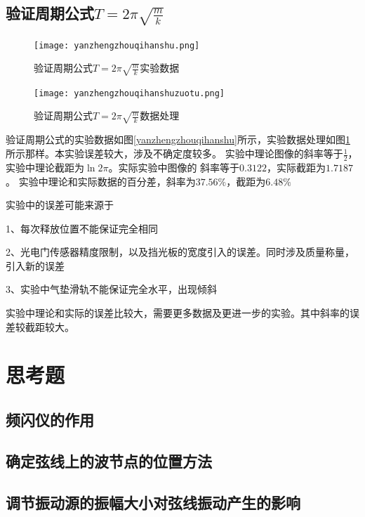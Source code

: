 \documentclass{ctexart}
\begin{document}
  \subsection{验证周期公式$T=2\pi \sqrt{\frac{m}{k}}$}
  \begin{figure}[b]
    \centering
    \begin{minipage}[b]{0.48\textwidth}
      \centering
      \texttt{[image: yanzhengzhouqihanshu.png]}
      \caption{验证周期公式$T=2\pi \sqrt{\frac{m}{k}}$实验数据}\label{yanzhengzhouqihanshu}
    \end{minipage}
    \begin{minipage}[b]{0.48\textwidth}
      \centering
      \texttt{[image: yanzhengzhouqihanshuzuotu.png]}
      \caption{验证周期公式$T=2\pi \sqrt{\frac{m}{k}}$数据处理}\label{yanzhengzhouqigongshizuotu}
    \end{minipage}
  \end{figure}
  验证周期公式的实验数据如图\ref{yanzhengzhouqihanshu}所示，实验数据处理如图\ref{yanzhengzhouqigongshizuotu}
  所示那样。本实验误差较大，涉及不确定度较多。
  实验中理论图像的斜率等于$\frac{1}{2}$，实验中理论截距为$\ln{2\pi}$。实际实验中图像的
  斜率等于$0.3122$，实际截距为$1.7187$。
  实验中理论和实际数据的百分差，斜率为$37.56\%$，截距为$6.48\%$

  实验中的误差可能来源于 
  
  1、每次释放位置不能保证完全相同

  2、光电门传感器精度限制，以及挡光板的宽度引入的误差。同时涉及质量称量，引入新的误差

  3、实验中气垫滑轨不能保证完全水平，出现倾斜

  实验中理论和实际的误差比较大，需要更多数据及更进一步的实验。其中斜率的误差较截距较大。
\newpage

\section{思考题}
  \subsection{频闪仪的作用}

  \subsection{确定弦线上的波节点的位置方法}

  \subsection{调节振动源的振幅大小对弦线振动产生的影响}
\newpage
\end{document}
